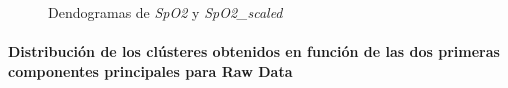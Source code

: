 \begin{figure}[ht]
    \centering
    \hfill
    \caption{Dendogramas de \textit{SpO2} y \textit{SpO2\_scaled}}\label{fig:raw_data_den_spo2}
\end{figure}

\paragraph{Distribución de los clústeres obtenidos en función de las dos primeras componentes principales para Raw Data}

